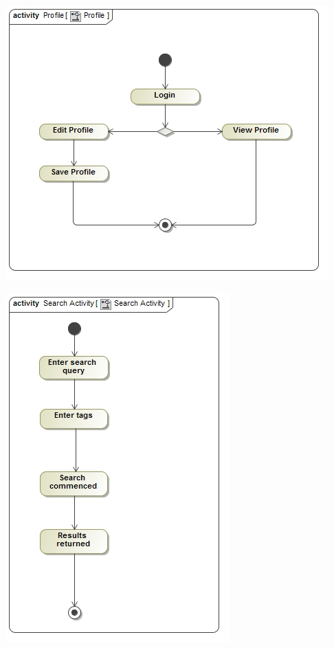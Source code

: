 \documentclass[12pt, oneside]{article}
\begin{document}
		 \includegraphics[scale=0.55]{Activity_Diagram__Profile__Profile}
		 \newline
		 
		 \includegraphics[scale=0.45]{Activity_Diagram__Search_Activity__Search_Activity}
		\newline		 
		 
\end{document}
